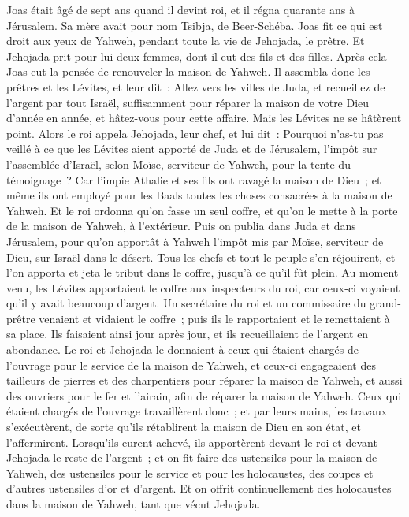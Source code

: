 \begin{multicols}{2}
\VerseOne{}Joas était âgé de sept ans quand il devint roi, et il régna quarante ans à Jérusalem. Sa mère avait pour nom Tsibja, de Beer-Schéba.
Joas fit ce qui est droit aux yeux de Yahweh, pendant toute la vie de Jehojada, le prêtre.
Et Jehojada prit pour lui deux femmes, dont il eut des fils et des filles.
Après cela Joas eut la pensée de renouveler la maison de Yahweh.
Il assembla donc les prêtres et les Lévites, et leur dit~: Allez vers les villes de Juda, et recueillez de l'argent par tout Israël, suffisamment pour réparer la maison de votre Dieu d'année en année, et hâtez-vous pour cette affaire. Mais les Lévites ne se hâtèrent point.
Alors le roi appela Jehojada, leur chef, et lui dit~: Pourquoi n'as-tu pas veillé à ce que les Lévites aient apporté de Juda et de Jérusalem, l'impôt sur l'assemblée d'Israël, selon Moïse, serviteur de Yahweh, pour la tente du témoignage~?
Car l'impie Athalie et ses fils ont ravagé la maison de Dieu~; et même ils ont employé pour les Baals toutes les choses consacrées à la maison de Yahweh.
Et le roi ordonna qu'on fasse un seul coffre, et qu'on le mette à la porte de la maison de Yahweh, à l'extérieur.
Puis on publia dans Juda et dans Jérusalem, pour qu'on apportât à Yahweh l'impôt mis par Moïse, serviteur de Dieu, sur Israël dans le désert.
Tous les chefs et tout le peuple s'en réjouirent, et l'on apporta et jeta le tribut dans le coffre, jusqu'à ce qu'il fût plein.
Au moment venu, les Lévites apportaient le coffre aux inspecteurs du roi, car ceux-ci voyaient qu'il y avait beaucoup d'argent. Un secrétaire du roi et un commissaire du grand-prêtre venaient et vidaient le coffre~; puis ils le rapportaient et le remettaient à sa place. Ils faisaient ainsi jour après jour, et ils recueillaient de l'argent en abondance.
Le roi et Jehojada le donnaient à ceux qui étaient chargés de l'ouvrage pour le service de la maison de Yahweh, et ceux-ci engageaient des tailleurs de pierres et des charpentiers pour réparer la maison de Yahweh, et aussi des ouvriers pour le fer et l'airain, afin de réparer la maison de Yahweh.
Ceux qui étaient chargés de l'ouvrage travaillèrent donc~; et par leurs mains, les travaux s'exécutèrent, de sorte qu'ils rétablirent la maison de Dieu en son état, et l'affermirent.
Lorsqu'ils eurent achevé, ils apportèrent devant le roi et devant Jehojada le reste de l'argent~; et on fit faire des ustensiles pour la maison de Yahweh, des ustensiles pour le service et pour les holocaustes, des coupes et d'autres ustensiles d'or et d'argent. Et on offrit continuellement des holocaustes dans la maison de Yahweh, tant que vécut Jehojada.

\end{multicols}

